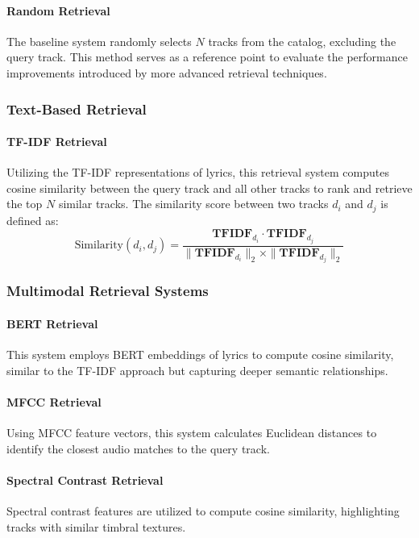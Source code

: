 \documentclass[sigconf]{acmart}
\begin{document}
\paragraph{Random Retrieval}
The baseline system randomly selects \( N \) tracks from the catalog, excluding the query track. This method serves as a reference point to evaluate the performance improvements introduced by more advanced retrieval techniques.

\subsubsection{Text-Based Retrieval}

\paragraph{TF-IDF Retrieval}
Utilizing the TF-IDF representations of lyrics, this retrieval system computes cosine similarity between the query track and all other tracks to rank and retrieve the top \( N \) similar tracks. The similarity score between two tracks \( d_i \) and \( d_j \) is defined as:
\[
\text{Similarity}(d_i, d_j) = \frac{\mathbf{TFIDF}_{d_i} \cdot \mathbf{TFIDF}_{d_j}}{\|\mathbf{TFIDF}_{d_i}\|_2 \times \|\mathbf{TFIDF}_{d_j}\|_2}
\]

\subsubsection{Multimodal Retrieval Systems}

\paragraph{BERT Retrieval}
This system employs BERT embeddings of lyrics to compute cosine similarity, similar to the TF-IDF approach but capturing deeper semantic relationships.

\paragraph{MFCC Retrieval}
Using MFCC feature vectors, this system calculates Euclidean distances to identify the closest audio matches to the query track.

\paragraph{Spectral Contrast Retrieval}
Spectral contrast features are utilized to compute cosine similarity, highlighting tracks with similar timbral textures.
\end{document}
